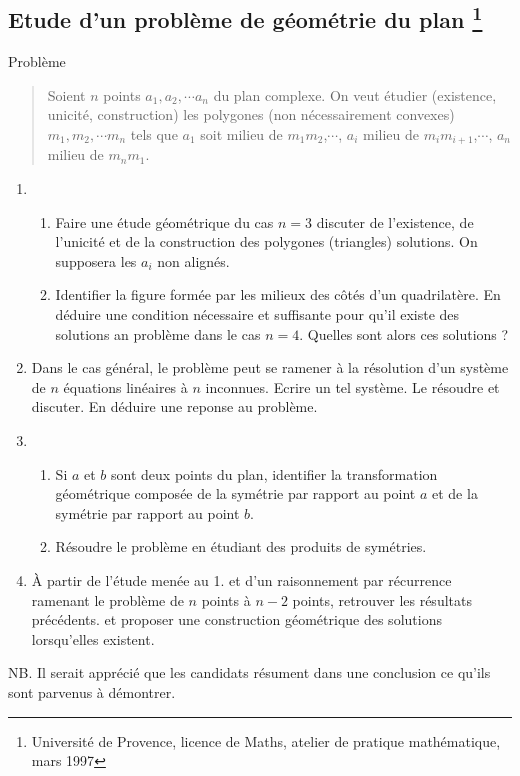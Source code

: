 \subsection*{Etude d'un problème de géométrie du plan \footnote{Université de Provence, licence de Maths, atelier de pratique mathématique, mars 1997}}

Problème
\begin{quote}
Soient $n$ points $a_{1}, a_{2}, \cdots a_{n}$ du plan complexe.\newline
On veut étudier (existence, unicité, construction) les polygones (non nécessairement convexes) $m_{1}, m_{2}, \cdots m_{n}$ tels que $a_{1}$ soit milieu de $m_{1}m_{2}$,$\cdots$, $a_{i}$ milieu de $m_{i}m_{i+1}$,$\cdots$, $a_{n}$ milieu de $m_{n}m_{1}$.
\end{quote} 

\begin{enumerate}
\item \begin{enumerate}
\item Faire une étude géométrique du cas $n=3$ discuter de l'existence, de l'unicité et de la construction des polygones (triangles) solutions. On supposera les $a_{i}$ non alignés.
\item Identifier la figure formée par les milieux des côtés d'un quadrilatère. En déduire une condition nécessaire et suffisante pour qu'il existe des solutions an problème dans le cas $n=4$. Quelles sont alors ces solutions ?
\end{enumerate}
\item Dans le cas général, le problème peut se ramener à la résolution d'un système de $n$ équations linéaires à $n$ inconnues. Ecrire un tel système. Le résoudre et discuter. En déduire une reponse au problème.

\item\begin{enumerate}
\item Si $a$ et $b$ sont deux points du plan, identifier la transformation géométrique composée de la symétrie par rapport au point $a$ et de la symétrie par rapport au point $b$.
\item Résoudre le problème en étudiant des produits de symétries.
\end{enumerate}
\item À partir de l'étude menée au 1. et d'un raisonnement par récurrence ramenant le problème de $n$ points à $n-2$ points, retrouver les résultats précédents. et proposer une construction géométrique des solutions lorsqu'elles existent.
\end{enumerate}
NB. Il serait apprécié que les candidats résument dans une conclusion ce qu'ils sont parvenus à démontrer.
